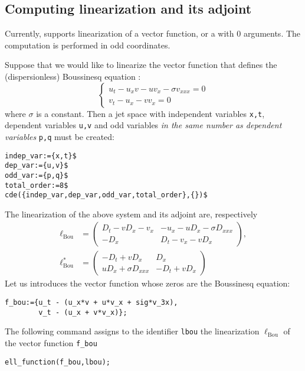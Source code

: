 \subsection{Computing linearization and its adjoint}
\label{cdesec:linadj}

Currently, \cde supports linearization of a vector function, or a \cdiffop with
$0$ arguments. The computation is performed in odd coordinates.

Suppose that we would like to linearize the vector function that defines the
(dispersionless) Boussinesq equation \cite{KerstenKrasilshchikVerboretsky:2006}:
\begin{equation}
  \label{cdeeq:1}
  \left\{
  \begin{array}{l}
  u_t-u_xv-uv_x-\sigma v_{xxx}=0\\
  v_t-u_x-vv_x=0
\end{array}
\right.
\end{equation}
where $\sigma$ is a constant. Then a jet space with independent variables
\texttt{x,t}, dependent variables \texttt{u,v} and odd variables \emph{in the
  same number as dependent variables} \texttt{p,q} must be created:
\begin{verbatim}
indep_var:={x,t}$
dep_var:={u,v}$
odd_var:={p,q}$
total_order:=8$
cde({indep_var,dep_var,odd_var,total_order},{})$
\end{verbatim}
The linearization of the above system and its adjoint are, respectively
\begin{align*}
  \ell_{\text{Bou}}&=
  \begin{pmatrix}
    D_t-vD_x-v_x & -u_x-uD_x-\sigma D_{xxx}\\
    -D_x & D_t-v_x-vD_x
  \end{pmatrix},\\
  \ell^*_{\text{Bou}}&=
  \begin{pmatrix}
    -D_t+vD_x & D_x\\
    uD_x+\sigma D_{xxx} & -D_t+vD_x
  \end{pmatrix}
\end{align*}
Let us introduces the vector function whose zeros are the Boussinesq equation:
\begin{verbatim}
f_bou:={u_t - (u_x*v + u*v_x + sig*v_3x),
        v_t - (u_x + v*v_x)};
\end{verbatim}
The following command assigns to the identifier \texttt{lbou} the linearization
\cdiffop $\ell_{\text{Bou}}$ of the vector function \texttt{f\_bou}
\begin{verbatim}
ell_function(f_bou,lbou);
\end{verbatim}
